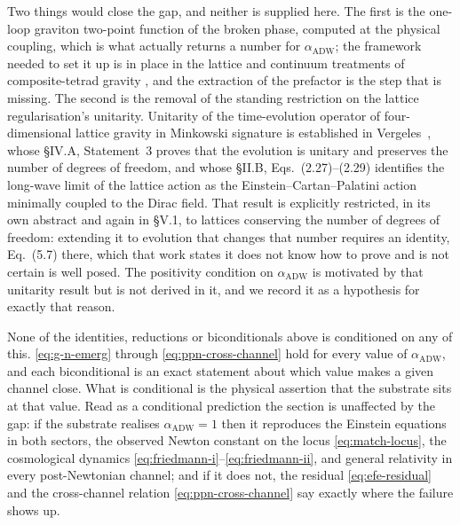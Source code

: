\documentclass[aps,prd,nofootinbib,superscriptaddress,12pt]{revtex4-2}
\begin{document}
Two things would close the gap, and neither is supplied here. The first is the
one-loop graviton two-point function of the broken phase, computed at the
physical coupling, which is what actually returns a number for
$\alpha_{\mathrm{ADW}}$; the framework needed to set it up is in place in the
lattice and continuum treatments of composite-tetrad gravity
\cite{Akama1978, Diakonov2011}, and the extraction of the prefactor is the step
that is missing. The second is the removal of the standing restriction on the
lattice regularisation's unitarity. Unitarity of the time-evolution operator of
four-dimensional lattice gravity in Minkowski signature is established in
Vergeles~\cite{Vergeles2025}, whose \S IV.A, Statement~3 proves that the
evolution is unitary and preserves the number of degrees of freedom, and whose
\S II.B, Eqs.~(2.27)--(2.29) identifies the long-wave limit of the lattice
action as the Einstein--Cartan--Palatini action minimally coupled to the Dirac
field. That result is explicitly restricted, in its own abstract and again in
\S V.1, to lattices conserving the number of degrees of freedom: extending it to
evolution that changes that number requires an identity, Eq.~(5.7) there, which
that work states it does not know how to prove and is not certain is
well posed. The positivity condition on $\alpha_{\mathrm{ADW}}$ is motivated by
that unitarity result but is not derived in it, and we record it as a hypothesis
for exactly that reason.

None of the identities, reductions or biconditionals above is conditioned on any
of this. \eqref{eq:g-n-emerg} through \eqref{eq:ppn-cross-channel} hold for
every value of $\alpha_{\mathrm{ADW}}$, and each biconditional is an exact
statement about which value makes a given channel close. What is conditional is
the physical assertion that the substrate sits at that value. Read as a
conditional prediction the section is unaffected by the gap: if the substrate
realises $\alpha_{\mathrm{ADW}} = 1$ then it reproduces the Einstein equations
in both sectors, the observed Newton constant on the locus
\eqref{eq:match-locus}, the cosmological dynamics
\eqref{eq:friedmann-i}--\eqref{eq:friedmann-ii}, and general relativity in every
post-Newtonian channel; and if it does not, the residual
\eqref{eq:efe-residual} and the cross-channel relation
\eqref{eq:ppn-cross-channel} say exactly where the failure shows up.

\end{document}
